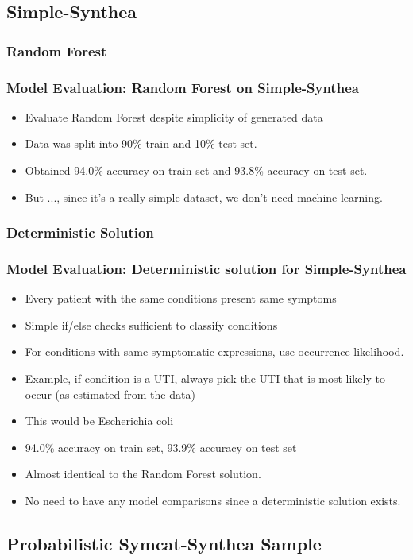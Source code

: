 \documentclass{beamer}
\begin{document}
	\subsection {Simple-Synthea}
		\subsubsection{Random Forest}
			\begin{frame}
				\frametitle{Model Evaluation: Random Forest on Simple-Synthea}
				\begin{itemize}
					\item Evaluate Random Forest despite simplicity of generated data
					\item Data was split into 90\% train and 10\% test set.
					\item Obtained 94.0\% accuracy on train set and 93.8\% accuracy on test set.
					\item But ..., since it's a really simple dataset, we don't need machine learning.
				\end{itemize}
			\end{frame}
		\subsubsection{Deterministic Solution}
			\begin{frame}
				\frametitle{Model Evaluation: Deterministic solution for Simple-Synthea}
				\begin{itemize}
					\item Every patient with the same conditions present same symptoms
					\item Simple if/else checks sufficient to classify conditions
					\item For conditions with same symptomatic expressions, use occurrence likelihood.
					\item Example, if condition is a UTI, always pick the UTI that is most likely to occur (as estimated from the data)
					\item This would be Escherichia coli
					\item 94.0\% accuracy on train set, 93.9\% accuracy on test set
					\item Almost identical to the Random Forest solution.
					\item No need to have any model comparisons since a deterministic solution exists.
				\end{itemize}
			\end{frame}
	\subsection{Probabilistic Symcat-Synthea Sample}
\end{document}
